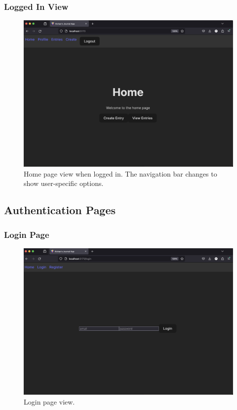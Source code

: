 \subsubsection{Logged In View}
\begin{figure}[H]
\centering
\includegraphics[width=\linewidth]{Assets/UI-home-logged-in.png}
\caption{Home page view when logged in. The navigation bar changes to show user-specific options.}
\label{fig:uihomeloggedin}
\end{figure}

\subsection{Authentication Pages}

\subsubsection{Login Page}
\begin{figure}[H]
\centering
\includegraphics[width=\linewidth]{Assets/UI-login.png}
\caption{Login page view.}
\label{fig:uilogin}
\end{figure}

